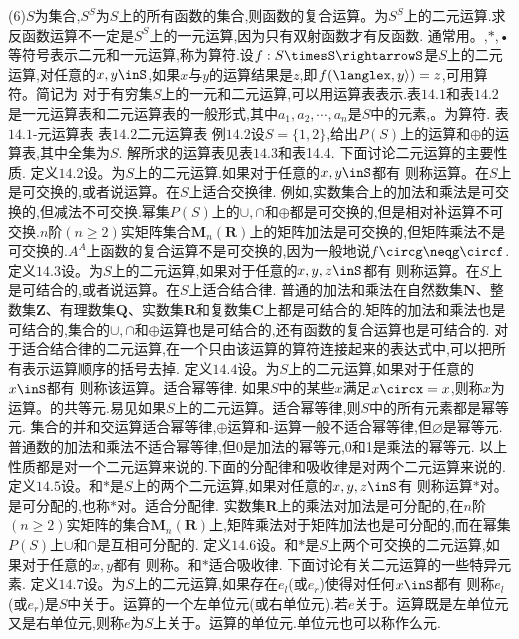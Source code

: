 (6)$S$为集合,$S^{S}$为$S$上的所有函数的集合,则函数的复合运算。为$S^{S}$上的二元运算.求反函数运算不一定是$S^{S}$上的一元运算,因为只有双射函数才有反函数.
通常用。,$*$,•等符号表示二元和一元运算,称为算符.设$f:S\timesS\rightarrowS$是$S$上的二元运算,对任意的$x,y\inS$,如果$x$与$y$的运算结果是$z$,即$f(\langlex,y\rangle)=z$,可用算符。简记为
对于有穷集$S$上的一元和二元运算,可以用运算表表示.表$14.1$和表$14.2$是一元运算表和二元运算表的一般形式,其中$a_{1},a_{2},\cdots,a_{n}$是$S$中的元素,。为算符.
{表$14.1$-元运算表}
表$14.2$二元运算表
例$14.2$设$S=\{1,2\}$,给出$P(S)$上的运算和$\oplus$的运算表,其中全集为$S$.
解所求的运算表见表$14.3$和表14.4.
下面讨论二元运算的主要性质.
定义$14.2$设。为$S$上的二元运算.如果对于任意的$x,y\inS$都有
则称运算。在$S$上是可交换的,或者说运算。在$S$上适合交换律.
例如,实数集合上的加法和乘法是可交换的,但减法不可交换.幂集$P(S)$上的$\cup,\cap$和$\oplus$都是可交换的,但是相对补运算不可交换.$n$阶$(n\geqslant2)$实矩阵集合$\boldsymbol{M}_{n}(\mathbf{R})$上的矩阵加法是可交换的,但矩阵乘法不是可交换的.$A^{A}$上函数的复合运算不是可交换的,因为一般地说$f\circg\neqg\circf$.
定义$14.3$设。为$S$上的二元运算,如果对于任意的$x,y,z\inS$都有
则称运算。在$S$上是可结合的,或者说运算。在$S$上适合结合律.
普通的加法和乘法在自然数集$\mathbf{N}$、整数集$\mathbf{Z}$、有理数集$\mathbf{Q}$、实数集$\mathbf{R}$和复数集$\mathbf{C}$上都是可结合的.矩阵的加法和乘法也是可结合的,集合的$\cup,\cap$和$\oplus$运算也是可结合的,还有函数的复合运算也是可结合的.
对于适合结合律的二元运算,在一个只由该运算的算符连接起来的表达式中,可以把所有表示运算顺序的括号去掉.
定义$14.4$设。为$S$上的二元运算,如果对于任意的$x\inS$都有
则称该运算。适合幂等律.
如果$S$中的某些$x$满足$x\circx=x$,则称$x$为运算。的共等元.易见如果$S$上的二元运算。适合幂等律,则$S$中的所有元素都是幂等元.
集合的并和交运算适合幂等律,$\oplus$运算和-运算一般不适合幂等律,但$\varnothing$是幂等元.普通数的加法和乘法不适合幂等律,但0是加法的幂等元,0和1是乘法的幂等元.
以上性质都是对一个二元运算来说的.下面的分配律和吸收律是对两个二元运算来说的.
定义$14.5$设。和$*$是$S$上的两个二元运算,如果对任意的$x,y,z\inS$有
则称运算$*$对。是可分配的,也称$*$对。适合分配律.
实数集$\mathbf{R}$上的乘法对加法是可分配的,在$n$阶$(n\geqslant2)$实矩阵的集合$\boldsymbol{M}_{n}(\mathbf{R})$上,矩阵乘法对于矩阵加法也是可分配的,而在幂集$P(S)$上$\cup$和$\cap$是互相可分配的.
定义$14.6$设。和$*$是$S$上两个可交换的二元运算,如果对于任意的$x,y$都有
则称。和$*$适合吸收律.
下面讨论有关二元运算的一些特异元素.
定义$14.7$设。为$S$上的二元运算,如果存在$e_{l}$(或$e_{r}$)使得对任何$x\inS$都有
则称$e_{l}$(或$e_{r}$)是$S$中关于。运算的一个左单位元(或右单位元).若$e$关于。运算既是左单位元又是右单位元,则称$e$为$S$上关于。运算的单位元.单位元也可以称作么元.

